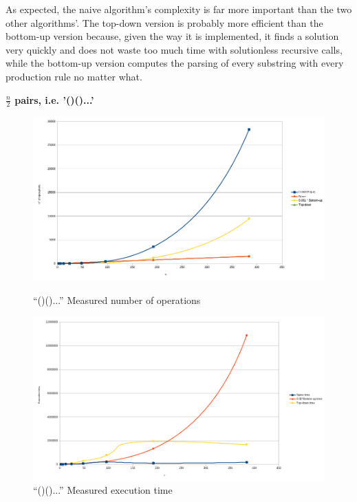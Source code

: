 \documentclass[]{article}
\begin{document}
\begin{multicols}{2}

As expected, the naive algorithm's complexity is far more important than the two
other algorithms'. The top-down version is probably more efficient than the
bottom-up version because,
given the way it is implemented, it finds a solution very quickly and does not
waste too much time with solutionless recursive calls, while the bottom-up
version computes the parsing of every substring with every production rule no
matter what.

\end{multicols}
\newpage
\textbf{$\frac n2$ pairs, i.e. '()()...'}\\
\begin{figure}[!htb]
\begin{minipage}{0.48\textwidth}
  \label{fig:plr}
  \centering
  \includegraphics[width=\linewidth]{paren/complexity_paren_left_right}
  \caption{``()()...'' Measured number of operations}
\end{minipage}\hfill
\begin{minipage}{0.48\textwidth}
  \centering
  \includegraphics[width=\linewidth]{paren/time_paren_left_right}
  \caption{``()()...'' Measured execution time}
\end{minipage}
\end{figure}
\end{document}
